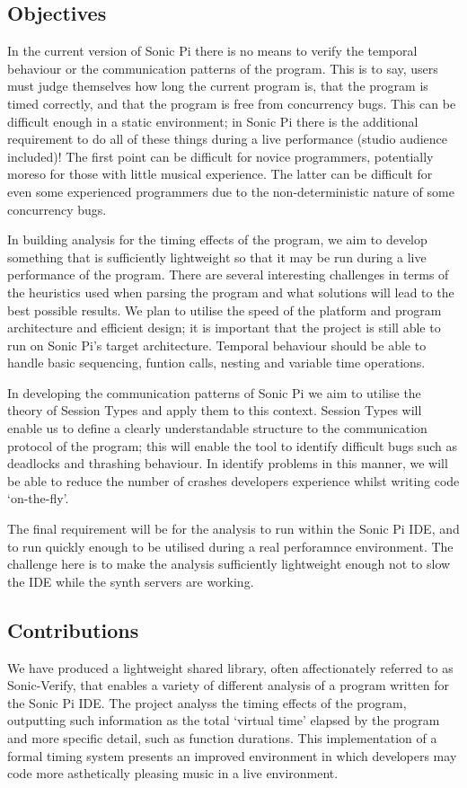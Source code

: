 \documentclass[11pt, abstracton, twoside, titlepage=true]{scrartcl}
\begin{document}
\subsection{Objectives}
In the current version of Sonic Pi \cite{sp} there is no means to verify the 
temporal behaviour or the communication patterns of the program. This is to say, 
users must judge themselves how long the current program is, that the program is 
timed correctly, and that the program is free from concurrency bugs. This can be 
difficult enough in a static environment; in Sonic Pi there is the additional 
requirement to do all of these things during a live performance (studio audience 
included)! The first point can be difficult for novice programmers, potentially 
moreso for those with little musical experience. The latter can be difficult for 
even some experienced programmers due to the non-deterministic nature of some 
concurrency bugs.

In building analysis for the timing effects of the program, we aim to develop
something that is sufficiently lightweight so that it may be run during a live 
performance of the program. There are several interesting challenges in terms of 
the heuristics used when parsing the program and what solutions will lead to the 
best possible results. We plan to utilise the speed of the platform and program 
architecture and efficient design; it is important that the project is still 
able to run on Sonic Pi's target architecture. Temporal behaviour should be able 
to handle basic sequencing, funtion calls, nesting and variable time operations. 

In developing the communication patterns of Sonic Pi we aim to utilise the
theory of Session Types and apply them to this context. Session Types will
enable us to define a clearly understandable structure to the communication
protocol of the program; this will enable the tool to identify difficult bugs
such as deadlocks and thrashing behaviour. In identify problems in this manner,
we will be able to reduce the number of crashes developers experience whilst 
writing code `on-the-fly'. 

The final requirement will be for the analysis to run within the Sonic Pi IDE, 
and to run quickly enough to be utilised during a real perforamnce environment. 
The challenge here is to make the analysis sufficiently lightweight enough not to
slow the IDE while the synth servers are working. 

\subsection{Contributions}
We have produced a lightweight shared library, often affectionately referred to 
as Sonic-Verify, that enables a variety of different analysis of a program 
written for the Sonic Pi IDE. The project analyss the timing effects of the 
program, outputting such information as the total `virtual time' elapsed by the 
program and more specific detail, such as function durations. This implementation
of a formal timing system presents an improved environment in which developers
may code more asthetically pleasing music in a live environment.
\end{document}
